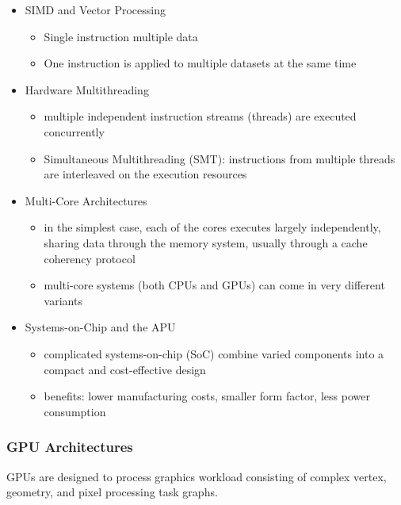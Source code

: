 \begin{itemize}
\tightlist
\item
  SIMD and Vector Processing

  \begin{itemize}
  \tightlist
  \item
    Single instruction multiple data
  \item
    One instruction is applied to multiple datasets at the same time
  \end{itemize}
\item
  Hardware Multithreading

  \begin{itemize}
  \tightlist
  \item
    multiple independent instruction streams (threads) are executed
    concurrently
  \item
    Simultaneous Multithreading (SMT): instructions from multiple
    threads are interleaved on the execution resources
  \end{itemize}
\item
  Multi-Core Architectures

  \begin{itemize}
  \tightlist
  \item
    in the simplest case, each of the cores executes largely
    independently, sharing data through the memory system, usually
    through a cache coherency protocol
  \item
    multi-core systems (both CPUs and GPUs) can come in very different
    variants
  \end{itemize}
\item
  Systems-on-Chip and the APU

  \begin{itemize}
  \tightlist
  \item
    complicated systems-on-chip (SoC) combine varied components into a
    compact and cost-effective design
  \item
    benefits: lower manufacturing costs, smaller form factor, less power
    consumption
  \end{itemize}
\end{itemize}

\hypertarget{gpu-architectures}{%
\subsubsection{GPU Architectures}\label{gpu-architectures}}

GPUs are designed to process graphics workload consisting of complex
vertex, geometry, and pixel processing task graphs.

